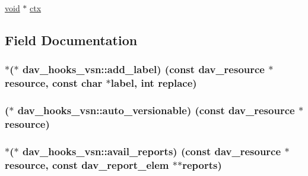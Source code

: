 \begin{DoxyCompactItemize}
\item 
\hyperlink{group__MOD__ISAPI_gacd6cdbf73df3d9eed42fa493d9b621a6}{void} $\ast$ \hyperlink{structdav__hooks__vsn_af5e40da45e314252ea3379f59d8d02a1}{ctx}
\end{DoxyCompactItemize}


\subsection{Field Documentation}
\subsubsection[{\texorpdfstring{add\+\_\+label}{add_label}}]{$\ast$($\ast$ dav\+\_\+hooks\+\_\+vsn\+::add\+\_\+label) (const {\bf dav\+\_\+resource} $\ast${\bf resource}, const char $\ast${\bf label}, {\bf int} replace)}\hypertarget{structdav__hooks__vsn_ad501bbf4e45cf171ae12f65caac908d2}{}\label{structdav__hooks__vsn_ad501bbf4e45cf171ae12f65caac908d2}
\subsubsection[{\texorpdfstring{auto\+\_\+versionable}{auto_versionable}}]{($\ast$ dav\+\_\+hooks\+\_\+vsn\+::auto\+\_\+versionable) (const {\bf dav\+\_\+resource} $\ast${\bf resource})}\hypertarget{structdav__hooks__vsn_a2eb0ca15810b65ed33f6113f32073656}{}\label{structdav__hooks__vsn_a2eb0ca15810b65ed33f6113f32073656}
\subsubsection[{\texorpdfstring{avail\+\_\+reports}{avail_reports}}]{$\ast$($\ast$ dav\+\_\+hooks\+\_\+vsn\+::avail\+\_\+reports) (const {\bf dav\+\_\+resource} $\ast${\bf resource}, const {\bf dav\+\_\+report\+\_\+elem} $\ast$$\ast$reports)}\hypertarget{structdav__hooks__vsn_aa7ea6f18f942b8c71d0d3969aed18523}{}\label{structdav__hooks__vsn_aa7ea6f18f942b8c71d0d3969aed18523}
